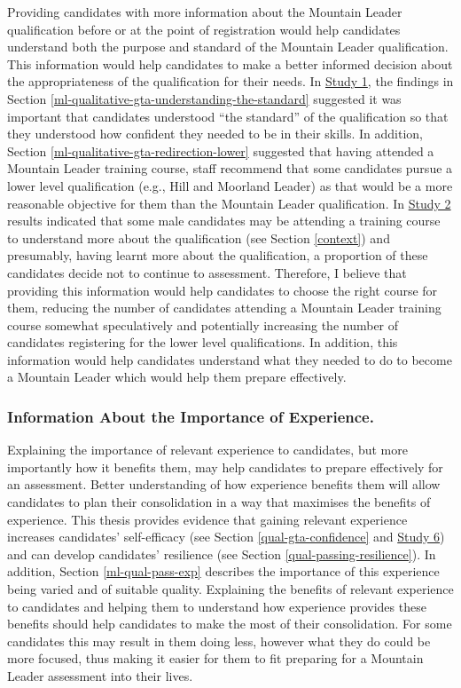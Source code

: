 \documentclass[
  12pt,
  a4paper,
]{book}
\begin{document}
Providing candidates with more information about the Mountain Leader qualification before or at the point of registration would help candidates understand both the purpose and standard of the Mountain Leader qualification. This information would help candidates to make a better informed decision about the appropriateness of the qualification for their needs. In \protect\hyperlink{ml-qualitative}{Study 1}, the findings in Section \ref{ml-qualitative-gta-understanding-the-standard} suggested it was important that candidates understood ``the standard'' of the qualification so that they understood how confident they needed to be in their skills. In addition, Section \ref{ml-qualitative-gta-redirection-lower} suggested that having attended a Mountain Leader training course, staff recommend that some candidates pursue a lower level qualification (e.g., Hill and Moorland Leader) as that would be a more reasonable objective for them than the Mountain Leader qualification. In \protect\hyperlink{male-gta}{Study 2} results indicated that some male candidates may be attending a training course to understand more about the qualification (see Section \ref{context}) and presumably, having learnt more about the qualification, a proportion of these candidates decide not to continue to assessment. Therefore, I believe that providing this information would help candidates to choose the right course for them, reducing the number of candidates attending a Mountain Leader training course somewhat speculatively and potentially increasing the number of candidates registering for the lower level qualifications. In addition, this information would help candidates understand what they needed to do to become a Mountain Leader which would help them prepare effectively.

\hypertarget{information-about-the-importance-of-experience.}{%
\subsubsection{Information About the Importance of Experience.}\label{information-about-the-importance-of-experience.}}

Explaining the importance of relevant experience to candidates, but more importantly how it benefits them, may help candidates to prepare effectively for an assessment. Better understanding of how experience benefits them will allow candidates to plan their consolidation in a way that maximises the benefits of experience. This thesis provides evidence that gaining relevant experience increases candidates' self-efficacy (see Section \ref{qual-gta-confidence} and \protect\hyperlink{study-6}{Study 6}) and can develop candidates' resilience (see Section \ref{qual-passing-resilience}). In addition, Section \ref{ml-qual-pass-exp} describes the importance of this experience being varied and of suitable quality. Explaining the benefits of relevant experience to candidates and helping them to understand how experience provides these benefits should help candidates to make the most of their consolidation. For some candidates this may result in them doing less, however what they do could be more focused, thus making it easier for them to fit preparing for a Mountain Leader assessment into their lives.
\end{document}

